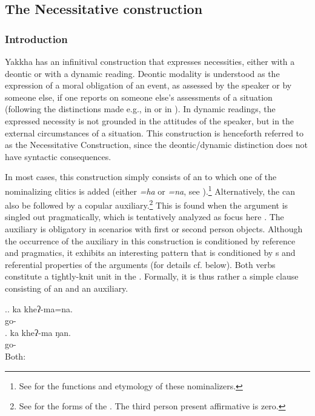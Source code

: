 \subsection{The Necessitative construction}\label{obl}

\subsubsection{Introduction}
Yakkha has an infinitival construction that expresses necessities, either with a deontic or with a dynamic reading. Deontic modality is understood as the expression of a moral obligation of an event, as assessed by the speaker or by someone else, if one reports on someone else's assessments of a situation (following the distinctions made e.g., in \citealt[2]{Nuyts2006_Modality} or in \citealt[12]{Vanlinden2012_Modal}). In  dynamic readings, the expressed necessity is not grounded in the attitudes of the speaker, but in the external circumstances of a situation.  This construction is henceforth referred to as the Necessitative Construction, since the deontic/dynamic distinction does not have syntactic consequences.

In most cases, this construction simply consists of an   to which one of the nominalizing clitics is added (either \emph{=ha} or \emph{=na}, see \Next[a]).\footnote{See  for the functions and etymology of these nominalizers.}  Alternatively, the  can also be followed by a copular auxiliary.\footnote{See  for the forms of the . The third person present affirmative is zero.} This is found when the argument is singled out pragmatically, which is tentatively analyzed as focus here \Next[b]. The auxiliary is obligatory in scenarios with first or second person objects. Although the occurrence of the auxiliary in this construction is conditioned by reference and pragmatics, it exhibits an interesting  pattern that is conditioned by s and referential properties of the arguments (for details cf. below). Both verbs constitute a tightly-knit unit in the . Formally,  it is thus rather a simple clause consisting of an  and an auxiliary. 

\ex.\ag. ka kheʔ-ma=na.\\
 go- \\
\bg. ka kheʔ-ma ŋan.\\
 go-  \\
Both:  


